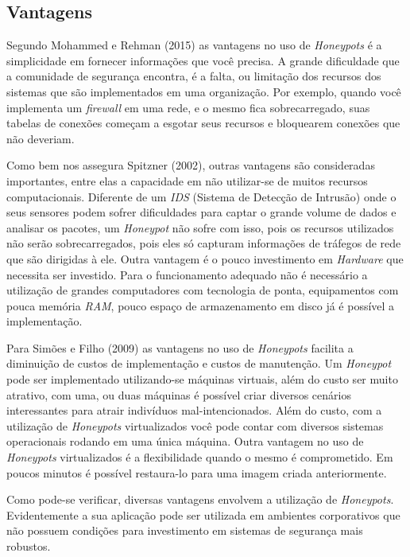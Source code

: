 \subsection{Vantagens}
Segundo Mohammed e Rehman (2015) as vantagens no uso de \textit{Honeypots} é a simplicidade em fornecer informações que você precisa. A grande dificuldade que a comunidade de segurança encontra, é a falta, ou limitação dos recursos dos sistemas que são implementados em uma organização. Por exemplo, quando você implementa um \textit{firewall} em uma rede, e o mesmo fica sobrecarregado, suas tabelas de conexões começam a esgotar seus recursos e bloquearem conexões que não deveriam. 

Como bem nos assegura Spitzner (2002), outras vantagens são consideradas importantes, entre elas a capacidade em não utilizar-se de muitos recursos computacionais. Diferente de um \textit{IDS} (Sistema de Detecção de Intrusão) onde o seus sensores podem sofrer dificuldades para captar o grande volume de dados e analisar os pacotes, um \textit{Honeypot} não sofre com isso, pois os recursos utilizados não serão sobrecarregados, pois eles só capturam informações de tráfegos de rede que são dirigidas à ele. Outra vantagem é o pouco investimento em \textit{Hardware} que necessita ser investido. Para o funcionamento adequado não é necessário a utilização de grandes computadores com tecnologia de ponta, equipamentos com pouca memória \textit{RAM}, pouco espaço de armazenamento em disco já é possível a implementação.

Para Simões e Filho (2009) as vantagens no uso de \textit{Honeypots} facilita a diminuição de custos de implementação e custos de manutenção. Um \textit{Honeypot} pode ser implementado utilizando-se máquinas virtuais, além do custo ser muito atrativo, com uma, ou duas máquinas é possível criar diversos cenários interessantes para atrair indivíduos mal-intencionados. Além do custo, com a utilização de \textit{Honeypots} virtualizados você pode contar com diversos sistemas operacionais rodando em uma única máquina. Outra vantagem no uso de \textit{Honeypots} virtualizados é a flexibilidade quando o mesmo é comprometido. Em poucos minutos é possível restaura-lo para uma imagem criada anteriormente.

Como pode-se verificar, diversas vantagens envolvem a utilização de \textit{Honeypots}. Evidentemente a sua aplicação pode ser utilizada em ambientes corporativos que não possuem condições para investimento em sistemas de segurança mais robustos.

